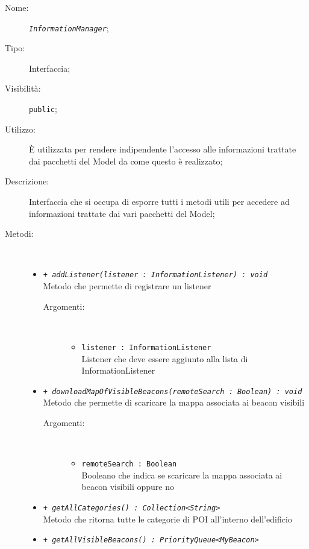\documentclass[../DefinizioneDiProdotto.tex]{subfiles}
\begin{document}
\begin{description}
	\item[Nome:] \texttt{\textit{InformationManager}};
	\item[Tipo:] Interfaccia;
	\item[Visibilità:] \texttt{public};
	\item[Utilizzo:] È utilizzata per rendere indipendente l'accesso alle informazioni trattate dai pacchetti del Model da come questo è realizzato;
	\item[Descrizione:] Interfaccia che si occupa di esporre tutti i metodi utili per accedere ad informazioni trattate dai vari pacchetti del Model;
	\item[Metodi:] \
	\begin{itemize}
		\item \texttt{+ \textit{addListener(listener : InformationListener) : void}}\\
		Metodo che permette di registrare un listener
		\begin{description}
			\item[Argomenti:] \
			\begin{itemize}
				\item \texttt{listener : InformationListener}\\
				Listener che deve essere aggiunto alla lista di InformationListener\end{itemize}
		\end{description}
		\item \texttt{+ \textit{downloadMapOfVisibleBeacons(remoteSearch : Boolean) : void}}\\
		Metodo che permette di scaricare la mappa associata ai beacon visibili
		\begin{description}
			\item[Argomenti:] \
			\begin{itemize}
				\item \texttt{remoteSearch : Boolean}\\
				Booleano che indica se scaricare la mappa associata ai beacon visibili oppure no\end{itemize}
		\end{description}
		\item \texttt{+ \textit{getAllCategories() : Collection<String>}}\\
		Metodo che ritorna tutte le categorie di POI all'interno dell'edificio
		\item \texttt{+ \textit{getAllVisibleBeacons() : PriorityQueue<MyBeacon>}}\\

\end{itemize}
\end{description}
\end{document}
